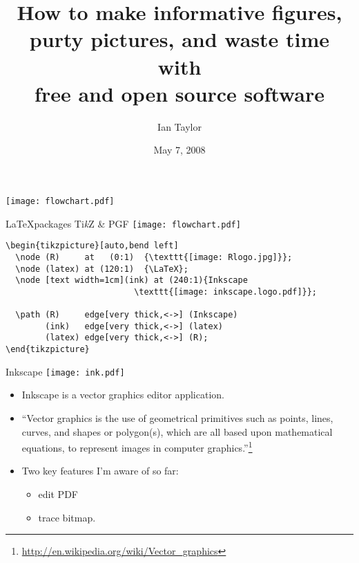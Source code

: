 \documentclass[12pt,mathserif]{beamer}
\title{How to make informative figures, \\ purty pictures, and waste time with \\ free and open source software}
\author{Ian Taylor}
\institute{Quantitative Ecology and Resource Management\\
University of Washington}
\date{May 7, 2008}
\begin{document}
\frame{
  \tableofcontents[part=1]
    \maketitle
}

\begin{frame}[fragile]
\begin{center}\texttt{[image: flowchart.pdf]}\end{center}
\end{frame}

\begin{frame}[fragile]
{\LaTeX packages {Ti\emph{k}Z} \& PGF}
\hspace{2in}\texttt{[image: flowchart.pdf]}
\scriptsize
\vspace{-.3in}
\begin{verbatim}
\begin{tikzpicture}[auto,bend left]
  \node (R)     at   (0:1)  {\texttt{[image: Rlogo.jpg]}};
  \node (latex) at (120:1)  {\LaTeX};
  \node [text width=1cm](ink) at (240:1){Inkscape
                          \texttt{[image: inkscape.logo.pdf]}};

  \path (R)     edge[very thick,<->] (Inkscape)
        (ink)   edge[very thick,<->] (latex)
        (latex) edge[very thick,<->] (R);
\end{tikzpicture}
\end{verbatim}
\end{frame}

\begin{frame}
{Inkscape}
\texttt{[image: ink.pdf]}
\begin{itemize}
\item Inkscape is a vector graphics editor application.
\item ``Vector graphics is the use of geometrical primitives such as points, lines, curves, and shapes or polygon(s), which are all based upon mathematical equations, to represent images in computer graphics.''\footnote{\url{http://en.wikipedia.org/wiki/Vector_graphics}}
\item Two key features I'm aware of so far:
\begin{itemize}
\item edit PDF
\item trace bitmap.\\
\end{itemize}
\end{itemize}
\end{frame}
\end{document}
